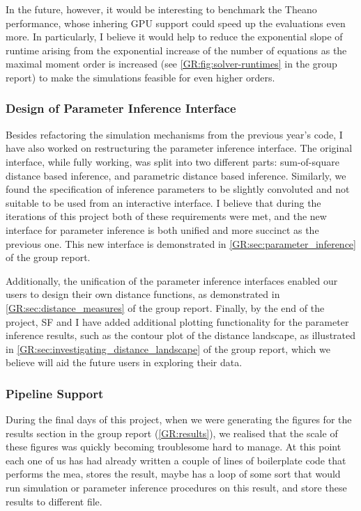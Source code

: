 In the future, however, it would be interesting to benchmark the Theano performance, whose inhering GPU support could speed up the evaluations even more.
In particularly, I believe it would help to reduce the exponential slope of runtime arising from the exponential increase of the number of equations as the maximal moment order is increased (see \autoref{GR:fig:solver-runtimes} in the group report) to make the simulations feasible for even higher orders. 

\subsubsection{Design of Parameter Inference Interface}

Besides refactoring the simulation mechanisms from the previous year's code, I have also worked on restructuring the parameter inference interface. 
The original interface, while fully working, was split into two different parts: sum-of-square distance based inference, and parametric distance based inference. Similarly, we found the specification of inference parameters to be slightly convoluted and not suitable to be used from an interactive interface. 
I believe that during the iterations of this project both of these requirements were met, and the new interface for parameter inference is
both unified and more succinct as the previous one. This new interface is demonstrated in \autoref*{GR:sec:parameter_inference} of the group report.

Additionally, the unification of the parameter inference interfaces enabled our users to design their own distance functions, as demonstrated in \autoref*{GR:sec:distance_measures} of the group report.
Finally, by the end of the project, SF and I have added additional plotting functionality for the parameter inference results, such as the contour plot of the distance landscape, as illustrated in 
\autoref*{GR:sec:investigating_distance_landscape} of the group report, which we believe will aid the future users in exploring their data.

\subsubsection{Pipeline Support}

During the final days of this project, when we were generating the figures for the results section in the group report (\autoref{GR:results}), we realised that the scale of these figures was quickly becoming troublesome hard to manage. 
At this point each one of us has had already written a couple of lines of boilerplate code that performs the \acrlong{mea}, stores the result, maybe has a loop of some sort that would run simulation or parameter inference procedures on this result, and store these results to different file.

